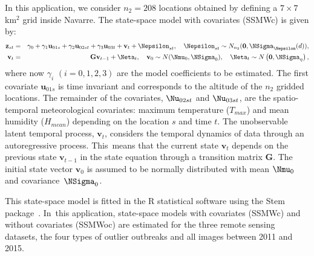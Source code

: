 In this application, we consider $n_2=208$ locations obtained by defining a $7 \times 7$ km$^2$ grid inside Navarre.
The state-space model with covariates (SSMWc) is given by:
\begin{eqnarray}
\mathbf{z}_{st} & = & \gamma_{0} + \gamma_{1}\mathbf{u}_{01{s}} +\gamma_{2}\mathbf{u}_{02st}+ \gamma_{3}\mathbf{u}_{03t} + \mathbf{v}_t+ \mathbf{\Nepsilon}_{st}, \quad \Nepsilon_{st}\sim N_{n_2}({\bf 0},\NSigma_{\Nepsilon}(d)), \label{Chap6:eq1}\\
\mathbf{v}_t & = & {{\bf G}}\mathbf{v}_{t-1} + {\Neta}_{t}, \quad \mathbf {v}_0 \sim N(\Nmu_0,\NSigma_0), \quad {\Neta}_{t} \sim N\left({\bf 0},\NSigma_{\eta}\right), \label{Chap6:eq2}
\end{eqnarray}
where now %
$\gamma_{i}$ $(i=0,1,2,3)$ are the model coefficients to be estimated. The first covariate $\mathbf{u}_{01s}$ %
is time invariant and corresponds to the altitude of the $n_2$ gridded locations. The remainder of the covariates, ${\Nu}_{02st}$ and ${\Nu}_{03st}$,
 are the spatio-temporal meteorological covariates: maximum temperature ($T_{max}$) and mean humidity ($H_{mean}$) {depending on} the location $s$ and time $t$.
 The unobservable latent temporal process, $\mathbf{v}_{t}$, considers the temporal dynamics of data
 through an {autoregressive} process. This~means that the current state $\mathbf{v}_t$ depends on the previous
 state $\mathbf{v}_{t-1}$ in the state equation {through a transition matrix {\bf G}}. The initial %
 state vector $\mathbf{v}_0$ is assumed to be normally distributed with mean $ \Nmu_0$ and covariance~$\NSigma_0$.

This state-space model is fitted in the \textsf{R} %
 statistical software using the {Stem} %
 package~\citep{stem}. In~this application, state-space models with covariates (SSMWc) and without covariates (SSMWoc) are estimated for the three remote sensing datasets, the four types of outlier outbreaks and all images between 2011 and 2015.



